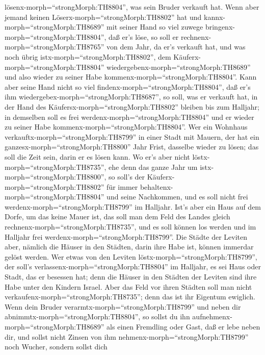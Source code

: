 lösenx-morph=``strongMorph:TH8804'', was sein Bruder verkauft hat.
 Wenn aber jemand keinen
Löserx-morph=``strongMorph:TH8802'' hat und
kannx-morph=``strongMorph:TH8689'' mit seiner Hand so viel zuwege
bringenx-morph=``strongMorph:TH8804'', daß er's löse,  so
soll er rechnenx-morph=``strongMorph:TH8765'' von dem Jahr, da er's
verkauft hat, und was noch übrig istx-morph=``strongMorph:TH8802'', dem
Käuferx-morph=``strongMorph:TH8804''
wiedergebenx-morph=``strongMorph:TH8689'' und also wieder zu seiner Habe
kommenx-morph=``strongMorph:TH8804''.  Kann aber seine Hand
nicht so viel findenx-morph=``strongMorph:TH8804'', daß er's ihm
wiedergebex-morph=``strongMorph:TH8687'', so soll, was er verkauft hat,
in der Hand des Käufersx-morph=``strongMorph:TH8802'' bleiben bis zum
Halljahr; in demselben soll es frei werdenx-morph=``strongMorph:TH8804''
und er wieder zu seiner Habe kommenx-morph=``strongMorph:TH8804''.
 Wer ein Wohnhaus verkauftx-morph=``strongMorph:TH8799'' in
einer Stadt mit Mauern, der hat ein ganzesx-morph=``strongMorph:TH8800''
Jahr Frist, dasselbe wieder zu lösen; das soll die Zeit sein, darin er
es lösen kann.  Wo er's aber nicht
löstx-morph=``strongMorph:TH8735'', ehe denn das ganze Jahr um
istx-morph=``strongMorph:TH8800'', so soll's der
Käuferx-morph=``strongMorph:TH8802'' für immer
behaltenx-morph=``strongMorph:TH8804'' und seine Nachkommen, und es soll
nicht frei werdenx-morph=``strongMorph:TH8799'' im Halljahr.
 Ist's aber ein Haus auf dem Dorfe, um das keine Mauer ist,
das soll man dem Feld des Landes gleich
rechnenx-morph=``strongMorph:TH8735'', und es soll können los werden und
im Halljahr frei werdenx-morph=``strongMorph:TH8799''.  Die
Städte der Leviten aber, nämlich die Häuser in den Städten, darin ihre
Habe ist, können immerdar gelöst werden.  Wer etwas von den
Leviten löstx-morph=``strongMorph:TH8799'', der soll's
verlassenx-morph=``strongMorph:TH8804'' im Halljahr, es sei Haus oder
Stadt, das er besessen hat; denn die Häuser in den Städten der Leviten
sind ihre Habe unter den Kindern Israel.  Aber das Feld vor
ihren Städten soll man nicht verkaufenx-morph=``strongMorph:TH8735'';
denn das ist ihr Eigentum ewiglich.  Wenn dein Bruder
verarmtx-morph=``strongMorph:TH8799'' und neben dir
abnimmtx-morph=``strongMorph:TH8804'', so sollst du ihn
aufnehmenx-morph=``strongMorph:TH8689'' als einen Fremdling oder Gast,
daß er lebe neben dir,  und sollst nicht Zinsen von ihm
nehmenx-morph=``strongMorph:TH8799'' noch Wucher, sondern sollst dich
